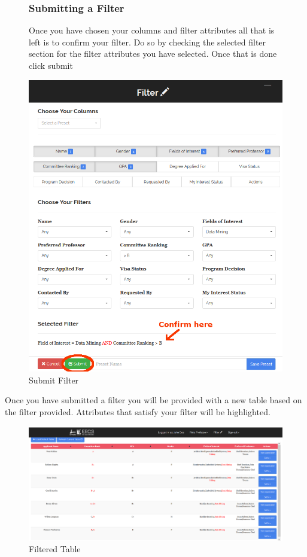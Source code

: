\documentclass[fontsize=12pt,paper=letter,twoside]{scrartcl}
\begin{document}
\clearpage 
\begin{figure}[!htb]
\subsubsection{Submitting a Filter}
Once you have chosen your columns and filter attributes all that is left is to confirm your filter. Do so by checking the selected filter section for the filter attributes you have selected. Once that is done click submit
\begin{center}
\includegraphics[width=.99\textwidth]{images/submit_filter.png}
\end{center}
\caption{Submit Filter}
\label{fig:submit_filter}
\end{figure}

\clearpage
Once you have submitted a filter you will be provided with a new table based on the filter provided. Attributes that satisfy your filter will be highlighted.
\begin{figure}[!htb]
\begin{center}
\includegraphics[width=.99\textwidth]{images/filtered_table.png}
\end{center}
\caption{Filtered Table}
\label{fig:filtered_table}
\end{figure}
\end{document}
